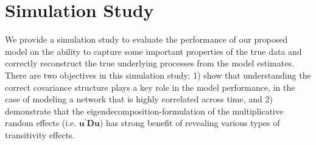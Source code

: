 \documentclass[a4paper]{article}
\begin{document}
\section{Simulation Study}\label{sec: simulation study}
We provide a simulation study to evaluate the performance of our proposed model on the ability to capture some important properties of the true data and correctly reconstruct the true underlying processes from the model estimates. There are two objectives in this simulation study: 1) show that understanding the correct covariance structure plays a key role in the model performance, in the case of modeling a network that is highly correlated across time, and 2) demonstrate that the eigendecomposition-formulation of the multiplicative random effects (i.e. $\boldsymbol{u}^\prime \mathbf{D}\boldsymbol{u}$) has strong benefit of revealing various types of transitivity effects.
\end{document}
